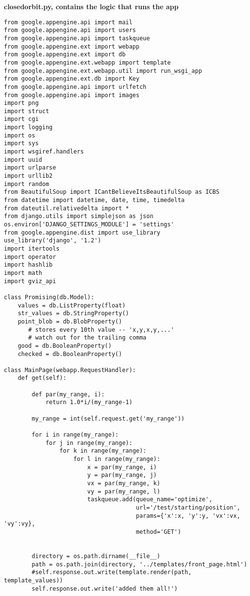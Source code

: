 \documentclass[11pt]{article}
\begin{document}
\newline
\begin{center}
\textbf{closedorbit.py, contains the logic that runs the app}
\end{center}
\begin{verbatim}
from google.appengine.api import mail
from google.appengine.api import users
from google.appengine.api import taskqueue
from google.appengine.ext import webapp
from google.appengine.ext import db
from google.appengine.ext.webapp import template
from google.appengine.ext.webapp.util import run_wsgi_app
from google.appengine.ext.db import Key
from google.appengine.api import urlfetch
from google.appengine.api import images
import png
import struct
import cgi
import logging
import os
import sys
import wsgiref.handlers
import uuid
import urlparse
import urllib2
import random
from BeautifulSoup import ICantBelieveItsBeautifulSoup as ICBS
from datetime import datetime, date, time, timedelta
from dateutil.relativedelta import *
from django.utils import simplejson as json
os.environ['DJANGO_SETTINGS_MODULE'] = 'settings'
from google.appengine.dist import use_library
use_library('django', '1.2')
import itertools
import operator
import hashlib
import math
import gviz_api

class Promising(db.Model):
    values = db.ListProperty(float)
    str_values = db.StringProperty()
    point_blob = db.BlobProperty()
       # stores every 10th value -- 'x,y,x,y,...'
       # watch out for the trailing comma
    good = db.BooleanProperty()
    checked = db.BooleanProperty()

class MainPage(webapp.RequestHandler):
    def get(self):
        
        def par(my_range, i):
            return 1.0*i/(my_range-1)

        my_range = int(self.request.get('my_range'))

        for i in range(my_range):
            for j in range(my_range):
                for k in range(my_range):
                    for l in range(my_range):
                        x = par(my_range, i)
                        y = par(my_range, j)
                        vx = par(my_range, k)
                        vy = par(my_range, l)
                        taskqueue.add(queue_name='optimize',
                                      url='/test/starting/position',
                                      params={'x':x, 'y':y, 'vx':vx, 'vy':vy},
                                      method='GET')
      

        directory = os.path.dirname(__file__)
        path = os.path.join(directory, '../templates/front_page.html')
        #self.response.out.write(template.render(path, template_values))
        self.response.out.write('added them all!')


\end{verbatim}
\end{document}

